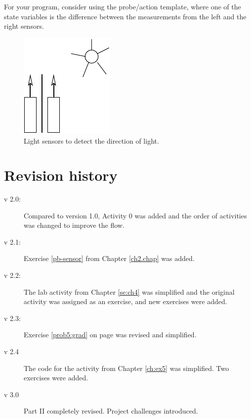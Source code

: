 \documentclass[12pt]{book}
\begin{document}
For your program, consider using the probe/action template, where one
of the state variables is the difference between the measurements from
the left and the right sensors.

\begin{figure}[tb]
  \begin{center}
	\includegraphics[width=.2\textwidth]{figs/2eyes}
  \end{center}
\caption{Light sensors to detect the direction of
  light.}	\label{fig:2eyes} 
\end{figure}



\appendix
\chapter{Revision history}

\begin{description}
\item[v 2.0:] Compared to version 1.0, Activity 0 was added and the
  order of activities was changed to improve the flow.
\item[v 2.1:] Exercise \ref{pb-sensor} from Chapter \ref{ch2.chap} was
  added.
\item[v 2.2:] The lab activity from Chapter \ref{se:ch4} was
  simplified and the original activity was assigned as an exercise,
  and new exercises were added.
\item[v 2.3:] Exercise \ref{prob5:grad} on page \pageref{prob5:grad}
  was revised and simplified.
\item[v 2.4] The code for the activity from Chapter \ref{ch:ex5} was
  simplified. Two exercises were added.
\item[v 3.0] Part II completely revised. Project challenges introduced.
  
\end{description}
 
\end{document}
